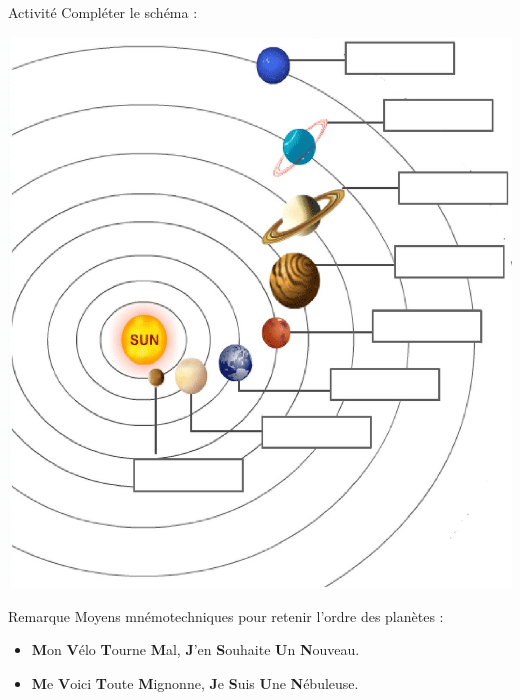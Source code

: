 \documentclass[xcolor={dvipsnames}]{beamer}
\begin{document}
\begin{frame}
\begin{block}{Activité}
	Compléter le schéma :
	\begin{center}
		\includegraphics[scale=0.3]{schema_systeme}
	\end{center}
\end{block}

\end{frame}


\begin{frame}

\begin{block}{Remarque}
	Moyens mnémotechniques pour retenir l'ordre des planètes :
	\begin{itemize}
		\item \textbf{M}on \textbf{V}élo \textbf{T}ourne \textbf{M}al, \textbf{J}'en \textbf{S}ouhaite \textbf{U}n \textbf{N}ouveau.
		\item \textbf{M}e \textbf{V}oici \textbf{T}oute \textbf{M}ignonne, \textbf{J}e \textbf{S}uis \textbf{U}ne \textbf{N}ébuleuse.
	\end{itemize}
\end{block}

\end{frame}
\end{document}
